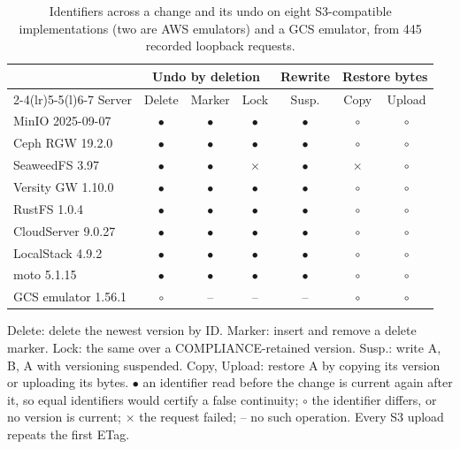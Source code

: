 \begin{table}[t]
\caption{Identifiers across a change and its undo on eight S3-compatible implementations (two are AWS emulators) and a GCS emulator, from 445 recorded loopback requests.}
\label{tab:probes}
\small
\setlength{\tabcolsep}{3.6pt}
\begin{tabular}{@{}lcccccc@{}}
\toprule
 & \multicolumn{3}{c}{Undo by deletion} & Rewrite & \multicolumn{2}{c}{Restore bytes}\\
\cmidrule(lr){2-4}\cmidrule(lr){5-5}\cmidrule(l){6-7}
Server & Delete & Marker & Lock & Susp. & Copy & Upload\\
\midrule
MinIO 2025-09-07 & {\large$\bullet$} & {\large$\bullet$} & {\large$\bullet$} & {\large$\bullet$} & {\large$\circ$} & {\large$\circ$} \\
Ceph RGW 19.2.0 & {\large$\bullet$} & {\large$\bullet$} & {\large$\bullet$} & {\large$\bullet$} & {\large$\circ$} & {\large$\circ$} \\
SeaweedFS 3.97 & {\large$\bullet$} & {\large$\bullet$} & $\times$ & {\large$\bullet$} & $\times$ & {\large$\circ$} \\
Versity GW 1.10.0 & {\large$\bullet$} & {\large$\bullet$} & {\large$\bullet$} & {\large$\bullet$} & {\large$\circ$} & {\large$\circ$} \\
RustFS 1.0.4 & {\large$\bullet$} & {\large$\bullet$} & {\large$\bullet$} & {\large$\bullet$} & {\large$\circ$} & {\large$\circ$} \\
CloudServer 9.0.27 & {\large$\bullet$} & {\large$\bullet$} & {\large$\bullet$} & {\large$\bullet$} & {\large$\circ$} & {\large$\circ$} \\
LocalStack 4.9.2 & {\large$\bullet$} & {\large$\bullet$} & {\large$\bullet$} & {\large$\bullet$} & {\large$\circ$} & {\large$\circ$} \\
moto 5.1.15 & {\large$\bullet$} & {\large$\bullet$} & {\large$\bullet$} & {\large$\bullet$} & {\large$\circ$} & {\large$\circ$} \\
\midrule
GCS emulator 1.56.1 & {\large$\circ$} & -- & -- & -- & {\large$\circ$} & {\large$\circ$} \\
\bottomrule
\end{tabular}

\smallskip\parbox{\columnwidth}{\footnotesize Delete: delete the newest version by ID. Marker: insert and remove a delete marker. Lock: the same over a COMPLIANCE-retained version. Susp.: write A, B, A with versioning suspended. Copy, Upload: restore A by copying its version or uploading its bytes. $\bullet$ an identifier read before the change is current again after it, so equal identifiers would certify a false continuity; $\circ$ the identifier differs, or no version is current; $\times$ the request failed; -- no such operation. Every S3 upload repeats the first ETag.}
\end{table}
